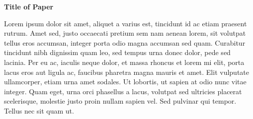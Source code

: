 \documentclass[12pt, letterpaper]{article}
\begin{document}

\noindent{\today}




\begin{center}
	\textbf{Title of Paper}
\end{center}
\vspace{0.2in}

Lorem ipsum dolor sit amet, aliquet a varius est, tincidunt id ac etiam praesent rutrum. Amet sed, justo occaecati pretium sem nam aenean lorem, sit volutpat tellus eros accumsan, integer porta odio magna accumsan sed quam. Curabitur tincidunt nibh dignissim quam leo, sed tempus urna donec dolor, pede sed lacinia. Per eu ac, iaculis neque dolor, et massa rhoncus et lorem mi elit, porta lacus eros aut ligula ac, faucibus pharetra magna mauris et amet. Elit vulputate ullamcorper, etiam urna amet sodales. Ut lobortis, ut sapien at odio nunc vitae integer. Quam eget, urna orci phasellus a lacus, volutpat sed ultricies placerat scelerisque, molestie justo proin nullam sapien vel. Sed pulvinar qui tempor. Tellus nec sit quam ut.
\end{document}
